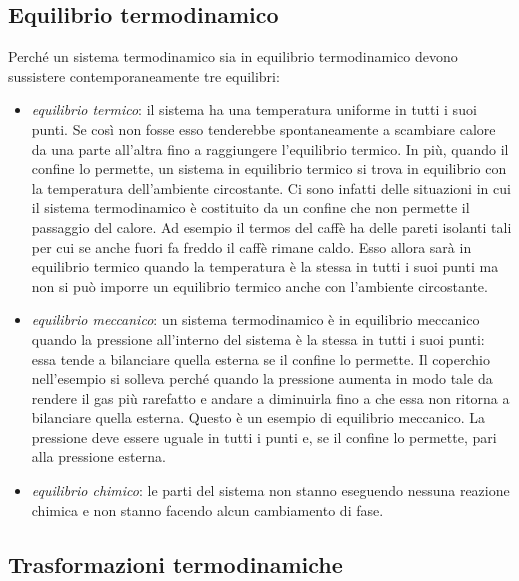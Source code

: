 \documentclass[10pt,a4paper]{book}
\begin{document}
\subsection{Equilibrio termodinamico}

Perché un sistema termodinamico sia in equilibrio termodinamico devono sussistere contemporaneamente tre equilibri:
\begin{itemize}
	\item \emph{equilibrio termico}: il sistema ha una temperatura uniforme in tutti i suoi punti. Se così non fosse esso tenderebbe spontaneamente a scambiare calore da una parte all'altra fino a raggiungere l'equilibrio termico. In più, quando il confine lo permette, un sistema in equilibrio termico si trova in equilibrio con la temperatura dell'ambiente circostante. Ci sono infatti delle situazioni in cui il sistema termodinamico è costituito da un confine che non permette il passaggio del calore. Ad esempio il termos del caffè ha delle pareti isolanti tali per cui se anche fuori fa freddo il caffè rimane caldo. Esso allora sarà in equilibrio termico quando la temperatura è la stessa in tutti i suoi punti ma non si può imporre un equilibrio termico anche con l'ambiente circostante.
	\item \emph{equilibrio meccanico}: un sistema termodinamico è in equilibrio meccanico quando la pressione all'interno del sistema è la stessa in tutti i suoi punti: essa tende a bilanciare quella esterna se il confine lo permette. Il coperchio nell'esempio si solleva perché quando la pressione aumenta in modo tale da rendere il gas più rarefatto e andare a diminuirla fino a che essa non ritorna a bilanciare quella esterna. Questo è un esempio di equilibrio meccanico. La pressione deve essere uguale in tutti i punti e, se il confine lo permette, pari alla pressione esterna.
	\item \emph{equilibrio chimico}: le parti del sistema non stanno eseguendo nessuna reazione chimica e non stanno facendo alcun cambiamento di fase.
\end{itemize}

\subsection{Trasformazioni termodinamiche}
\end{document}
